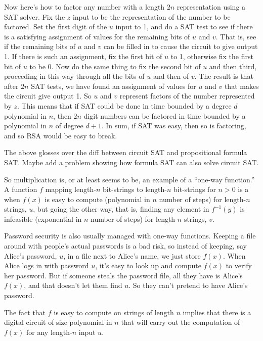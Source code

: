 Now here's how to factor any number with a length $2n$ representation using a SAT solver.
Fix the $z$ input to be the representation of the number to be factored.  Set the first
digit of the $u$ input to 1, and do a SAT test to see if there is a satisfying assignment
of values for the remaining bits of $u$ and $v$.  That is, see if the remaining bits of $u$
and $v$ can be filled in to cause the circuit to give output 1.  If there is such an
assignment, fix the first bit of $u$ to 1, otherwise fix the first bit of $u$ to be 0.  Now
do the same thing to fix the second bit of $u$ and then third, proceeding in this way
through all the bits of $u$ and then of $v$.  The result is that after $2n$ SAT tests, we
have found an assignment of values for $u$ and $v$ that makes the circuit give output 1.
So $u$ and $v$ represent factors of the number represented by $z$.  This means that if SAT
could be done in time bounded by a degree $d$ polynomial in $n$, then $2n$ digit numbers
can be factored in time bounded by a polynomial in $n$ of degree $d+1$.  In sum, if SAT was
easy, then so is factoring, and so RSA would be easy to break.

\begin{editingnotes}
The above glosses over the diff between circuit SAT and propositional formula SAT.  Maybe
add a problem showing how formula SAT can also solve circuit SAT.
\end{editingnotes}

\iffalse

So multiplication is, or at least seems to be, an example of a ``one-way function.''  A
function $f$ mapping length-$n$ bit-strings to length-$n$ bit-strings for $n > 0$ is a
 when $f(x)$ is easy to compute (polynomial in $n$ number of steps)
for length-$n$ strings, $u$, but going the other way, that is, finding any element in
$f^{-1}(y)$ is infeasible (exponential in $n$ number of steps) for length-$n$ strings, $v$.

Password security is also usually managed with one-way functions.  Keeping a file around
with people's actual passwords is a bad risk, so instead of keeping, say Alice's password,
$u$, in a file next to Alice's name, we just store $f(x)$.  When Alice logs in with
password $u$, it's easy to look up and compute $f(x)$ to verify her password.  But if
someone steals the password file, all they have is Alice's $f(x)$, and that doesn't let
them find $u$.  So they can't pretend to have Alice's password.

The fact that $f$ is easy to compute on strings of length $n$ implies that there is a
digital circuit of size polynomial in $n$ that will carry out the computation of $f(x)$ for
any length-$n$ input $u$.

